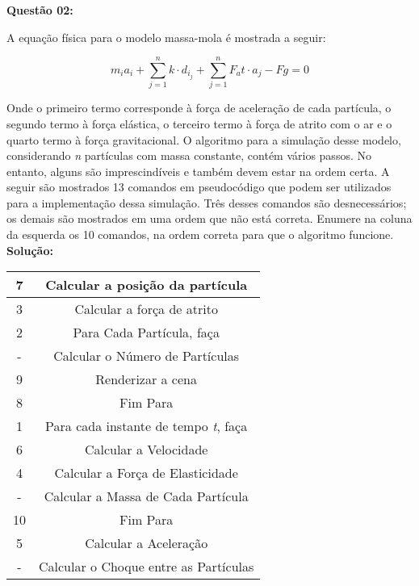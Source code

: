 \noindent\textbf{Questão 02:}

A equação física para o modelo massa-mola é mostrada a seguir:

\[m_ia_i + \sum\limits_{j=1}^{n} k \cdot d_i_j + \sum\limits_{j=1}^{n} F_at \cdot a_j - Fg = 0\]

Onde o primeiro termo corresponde à força de aceleração de cada partícula, o segundo termo à força elástica, o terceiro termo à força de atrito com o ar e o quarto termo à força gravitacional. O algoritmo para a simulação desse modelo, considerando \emph{n} partículas com massa constante, contém vários passos. No entanto, alguns são imprescindíveis e também devem estar na ordem certa. A seguir são mostrados 13 comandos em pseudocódigo que podem ser utilizados para a implementação dessa simulação. Três desses comandos são desnecessários; os demais são mostrados em uma ordem que não está correta. Enumere na coluna da esquerda os 10 comandos, na ordem correta para que o algoritmo funcione.\\
\newpage
\noindent\textbf{Solução:}
\begin{table}[h!]
    \centering
        \begin{tabular}{|| c | c ||}
        \hline
         7 & Calcular a posição da partícula \\ \hline
         3 & Calcular a força de atrito \\ \hline
         2 & Para Cada Partícula, faça \\ \hline
         - & Calcular o Número de Partículas \\ \hline
         9 & Renderizar a cena \\ \hline
         8 & Fim Para \\ \hline
         1 & Para cada instante de tempo \emph{t}, faça \\ \hline
         6 & Calcular a Velocidade \\ \hline
         4 & Calcular a Força de Elasticidade \\ \hline
         - & Calcular a Massa de Cada Partícula \\ \hline
         10 & Fim Para \\ \hline
         5 & Calcular a Aceleração \\ \hline
         - & Calcular o Choque entre as Partículas \\ \hline
        \end{tabular}
\end{table}
\vspace{0.5cm}

